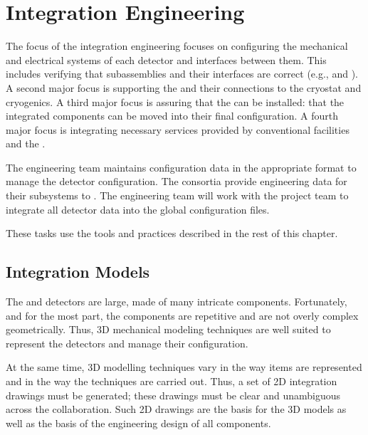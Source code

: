 ﻿\chapter{Integration Engineering}
\label{sec:fdsp-coord-integ-sysengr}


The focus of the integration engineering focuses on configuring the
mechanical and electrical systems of each detector and interfaces
between them. This includes verifying that subassemblies and their
interfaces are correct (e.g.,  and  ). A
second major focus is supporting the  and their
connections to the cryostat and cryogenics. A third major focus is
assuring that the  can be installed: that the
integrated components can be moved into their final configuration. A
fourth major focus is integrating necessary services provided by
conventional facilities and the .


The  engineering team maintains configuration data in
the appropriate format to manage the detector
configuration. The consortia provide engineering data for their
subsystems to . The  engineering team will work
with the  project team to integrate all detector data
into the global  configuration files.


These tasks use the tools and practices described in the rest of this
chapter.


\section{Integration Models}
\label{sec:fdsp-coord-integ-models}

The  and  detectors are large, made of many
intricate components. Fortunately, and for the most part, the
components are repetitive and are not overly complex
geometrically. Thus, 3D mechanical modeling techniques are well suited
to represent the detectors and manage their configuration.

At the same time, 3D modelling techniques vary in the way items are
represented and in the way the techniques are carried out. Thus, a set
of 2D integration drawings must be generated; these drawings must be
clear and unambiguous across the collaboration. Such 2D drawings are
the basis for the 3D models as well as the basis of the engineering
design of all components.



